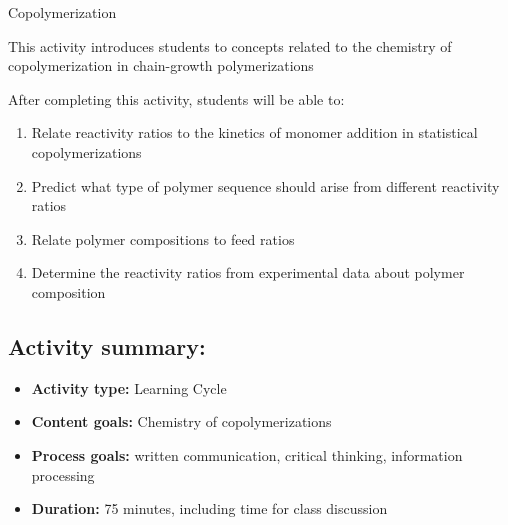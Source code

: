 %
%
%
%

\renewcommand{\figpath}{content/polymchem/copolymers/copolym/figs}
\renewcommand{\labelbase}{copolym}

\begin{activity}{Copolymerization}

\begin{instructornotes}
	This activity introduces students to concepts related to the chemistry of copolymerization in chain-growth polymerizations
	
	After completing this activity, students will be able to:
	\begin{enumerate}
		\item Relate reactivity ratios to the kinetics of monomer addition in statistical copolymerizations
		\item Predict what type of polymer sequence should arise from different reactivity ratios
		\item Relate polymer compositions to feed ratios
		\item Determine the reactivity ratios from experimental data about polymer composition
	\end{enumerate}
	
	\subsection*{Activity summary:}
	\begin{itemize}
		\item \textbf{Activity type:} Learning Cycle
		\item \textbf{Content goals:} Chemistry of copolymerizations
		\item \textbf{Process goals:} %
			written communication, critical thinking, information processing
		\item \textbf{Duration:} 75 minutes, including time for class discussion
		

\end{itemize}
\end{instructornotes}
\end{activity}
